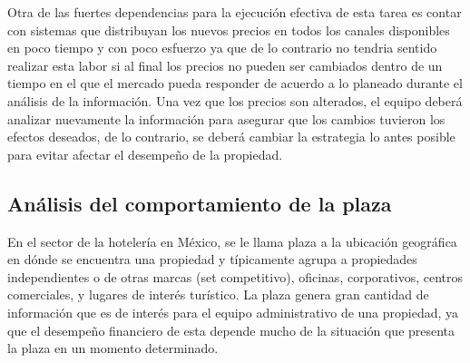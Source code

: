 Otra de las fuertes dependencias para la ejecución efectiva de esta tarea es contar con sistemas que distribuyan los nuevos precios en todos los canales disponibles en poco tiempo y con poco esfuerzo ya que de lo contrario no tendria sentido realizar esta labor si al final los precios no pueden ser cambiados dentro de un tiempo en el que el mercado pueda responder de acuerdo a lo planeado durante el análisis de la información. Una vez que los precios son alterados, el equipo deberá analizar nuevamente la información para asegurar que los cambios tuvieron los efectos deseados, de lo contrario, se deberá cambiar la estrategia lo antes posible para evitar afectar el desempeño de la propiedad.

\subsection*{Análisis del comportamiento de la plaza}

En el sector de la hotelería en México, se le llama plaza a la ubicación geográfica en dónde se encuentra una propiedad y típicamente agrupa a propiedades independientes o de otras marcas (set competitivo), oficinas, corporativos, centros comerciales, y lugares de interés turístico. La plaza genera gran cantidad de información que es de interés para el equipo administrativo de una propiedad, ya que el desempeño financiero de esta depende mucho de la situación que presenta la plaza en un momento determinado.


